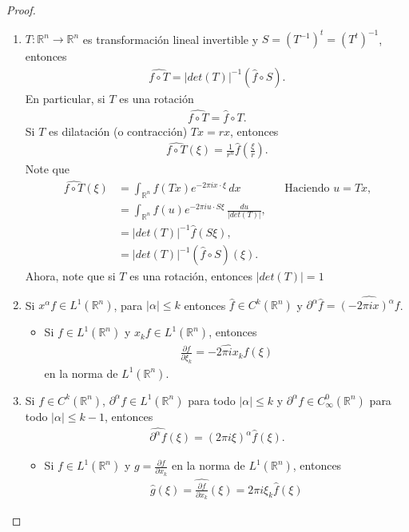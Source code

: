 \begin{proof}
\begin{enumerate}
      \item $T:\mathbb{R}^{n}\to\mathbb{R}^{n}$ es transformación lineal invertible y $S=\left( T^{-1} \right)^{t}=\left( T^{t} \right)^{-1}$, entonces
        \begin{align*}
          \hat{f\circ T}=|det(T)|^{-1}\left( \hat{f}\circ S \right).
        \end{align*}
        En particular, si $T$ es una rotación
        \begin{align*}
          \hat{f\circ T}=\hat{f}\circ T.
        \end{align*}
        Si $T$ es dilatación (o contracción) $Tx=rx$, entonces
        \begin{align*}
          \hat{f\circ T}(\xi)=\frac{1}{r^{n}}\hat{f}\left( \frac{\xi}{r} \right).
        \end{align*}
        Note que
        \begin{align*}
          \hat{f\circ T}(\xi)&=\int_{\mathbb{R}^{n}}f(Tx)e^{-2\pi ix\cdot\xi}\,dx &&\text{Haciendo $u=Tx$,}\\
          &=\int_{\mathbb{R}^{n}}f(u)e^{-2\pi i u\cdot S\xi}\,\frac{du}{|det(T)|},\\
          &=|det(T)|^{-1}\hat{f}(S\xi),\\
          &=|det(T)|^{-1}(\hat{f}\circ S)(\xi).
        \end{align*}
        Ahora, note que si $T$ es una rotación, entonces $|det(T)|=1$ 
      \item Si $x^{\alpha}f\in L^{1}(\mathbb{R}^{n})$, para $|\alpha|\leq k$ entonces $\hat{f}\in C^{k}(\mathbb{R}^{n})$ y $\partial^{\alpha}\hat{f}=\hat{(-2\pi ix)^{\alpha}f}$.
      \begin{itemize}
        \item Si $f\in L^{1}(\mathbb{R}^{n})$ y $x_{k}f\in L^{1}(\mathbb{R}^{n})$, entonces 
          \begin{align*}
            \frac{\partial \hat{f}}{\partial \xi_k}=\hat{-2\pi ix_{k}f}(\xi)
          \end{align*}
          en la norma de $L^1(\mathbb{R}^{n})$.
      \end{itemize}
      \item Si $f\in C^{k}(\mathbb{R}^{n})$, $\partial^{\alpha}f\in L^{1}(\mathbb{R}^{n})$ para todo $|\alpha|\leq k$ y $\partial^{\alpha}f\in C^{0}_{\infty}(\mathbb{R}^{n})$ para todo $|\alpha|\leq k-1$, entonces
        \begin{align*}
          \hat{\partial^{\alpha}f}(\xi)=(2\pi i\xi)^{\alpha}\hat{f}(\xi).
        \end{align*}
        \begin{itemize}
          \item Si $f\in L^{1}(\mathbb{R}^{n})$ y $g=\frac{\partial f}{\partial x_k}$ en la norma de $L^1(\mathbb{R}^{n})$, entonces
            \begin{align*}
              \hat{g}(\xi)=\hat{\frac{\partial f}{\partial x_k}}(\xi)=2\pi i\xi_{k}\hat{f}(\xi)
            \end{align*}
        \end{itemize}       
    \end{enumerate} 
  \end{proof}

